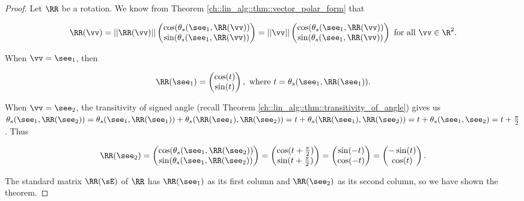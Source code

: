 \begin{proof}
	Let $\RR$ be a rotation. We know from Theorem \ref{ch::lin_alg::thm::vector_polar_form} that 
	
	\begin{align*}
		\RR(\vv) =
		||\RR(\vv)||
		\begin{pmatrix}
			\cos(\theta_s(\see_1, \RR(\vv)) \\
			\sin(\theta_s(\see_1, \RR(\vv))
		\end{pmatrix}
		=
		||\vv||
		\begin{pmatrix}
			\cos(\theta_s(\see_1, \RR(\vv)) \\
			\sin(\theta_s(\see_1, \RR(\vv))
		\end{pmatrix}
		\text{ for all $\vv \in \R^2$.}
	\end{align*}
	
	When $\vv = \see_1$, then
	
	\begin{align*}
		\RR(\see_1) =
		\begin{pmatrix}
			\cos(t) \\
			\sin(t)
		\end{pmatrix},
		\text{ where $t = \theta_s(\see_1, \RR(\see_1))$}.
	\end{align*}
	
	When $\vv = \see_2$, the transitivity of signed angle (recall Theorem \ref{ch::lin_alg::thm::transitivity_of_angle}) gives us $\theta_s(\see_1, \RR(\see_2)) = \theta_s(\see_1, \RR(\see_1)) + \theta_s(\RR(\see_1), \RR(\see_2)) = t + \theta_s(\RR(\see_1), \RR(\see_2)) = t + \theta_s(\see_1, \see_2) = t + \frac{\pi}{2}$. Thus
	
	\begin{align*}
		\RR(\see_2) =
		\begin{pmatrix}
			\cos(\theta_s(\see_1, \RR(\see_2)) \\
			\sin(\theta_s(\see_1, \RR(\see_2))
		\end{pmatrix}
		=
		\begin{pmatrix}
			\cos(t + \frac{\pi}{2}) \\
			\sin(t + \frac{\pi}{2})
		\end{pmatrix}
		=
		\begin{pmatrix}
			\sin(-t) \\
			\cos(-t)
		\end{pmatrix}
		=
		\begin{pmatrix}
			-\sin(t) \\
			\cos(t)
		\end{pmatrix}.
	\end{align*}
	
	The standard matrix $\RR(\sE)$ of $\RR$ has $\RR(\see_1)$ as its first column and $\RR(\see_2)$ as its second column, so we have shown the theorem.
\end{proof}

